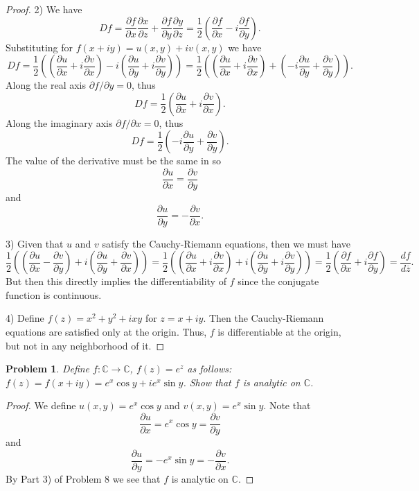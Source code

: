 \documentclass{article}
\newtheorem{problem}{Problem}
\begin{document}
\begin{flushleft}
\begin{proof}
2) We have
\[
Df = \frac{\partial f}{\partial x} \frac{\partial x}{\partial z} + \frac{\partial f}{\partial y} \frac{\partial y}{\partial z} = \frac{1}{2} \left ( \frac{\partial f}{\partial x} - i \frac{\partial f}{\partial y} \right ).
\]
Substituting for $f(x+iy) = u(x,y) + iv(x,y)$ we have
\[
Df = \frac{1}{2} \left ( \left ( \frac{\partial u}{\partial x} + i \frac{\partial v}{\partial x} \right ) - i \left (\frac{\partial u}{\partial y} + i \frac{\partial v}{\partial y} \right ) \right ) = \frac{1}{2} \left ( \left ( \frac{\partial u}{\partial x} + i \frac{\partial v}{\partial x} \right ) + \left (-i\frac{\partial u}{\partial y} +  \frac{\partial v}{\partial y} \right ) \right ).
\]
Along the real axis $\partial f/\partial y = 0$, thus
\[
Df = \frac{1}{2} \left ( \frac{\partial u}{\partial x} + i \frac{\partial v}{\partial x} \right ).
\]
Along the imaginary axis $\partial f/\partial x = 0$, thus
\[
Df = \frac{1}{2} \left ( -i \frac{\partial u}{\partial y} + \frac{\partial v}{\partial y} \right ).
\]
The value of the derivative must be the same in so
\[
\frac{\partial u}{\partial x} = \frac{\partial v}{\partial y}
\]
and
\[
\frac{\partial u}{\partial y} = -\frac{\partial v}{\partial x}.
\]\newline

3) Given that $u$ and $v$ satisfy the Cauchy-Riemann equations, then we must have
\[
\frac{1}{2} \left ( \left ( \frac{\partial u}{\partial x} - \frac{\partial v}{\partial y} \right ) + i \left (\frac{\partial u}{\partial y} +  \frac{\partial v}{\partial x} \right ) \right ) = \frac{1}{2} \left ( \left ( \frac{\partial u}{\partial x} + i \frac{\partial v}{\partial x} \right ) + i \left (\frac{\partial u}{\partial y} + i\frac{\partial v}{\partial y} \right ) \right ) = \frac{1}{2} \left ( \frac{\partial f}{\partial x} + i \frac{\partial f}{\partial y} \right ) = \frac{d f}{d \overline{z}}.
\]
But then this directly implies the differentiability of $f$ since the conjugate function is continuous.\newline

4) Define $f(z) = x^2 + y^2 + ixy$ for $z = x + iy$. Then the Cauchy-Riemann equations are satisfied only at the origin. Thus, $f$ is differentiable at the origin, but not in any neighborhood of it.
\end{proof}

\begin{problem}
Define $f : \mathbb{C} \rightarrow \mathbb{C}$, $f(z) = e^z$ as follows: $f(z) = f(x+iy) = e^x \cos y + ie^x \sin y$. Show that $f$ is analytic on $\mathbb{C}$.
\end{problem}
\begin{proof}
We define $u(x,y) = e^x \cos y$ and $v(x,y) = e^x \sin y$. Note that
\[
\frac{\partial u}{\partial x} = e^x \cos y = \frac{\partial v}{\partial y}
\]
and
\[
\frac{\partial u}{\partial y} = -e^x \sin y = -\frac{\partial v}{\partial x}.
\]
By Part 3) of Problem 8 we see that $f$ is analytic on $\mathbb{C}$.
\end{proof}


\end{flushleft}
\end{document}
